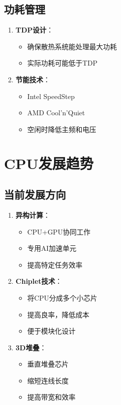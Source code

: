 \documentclass[12pt,UTF8]{ctexbook}
\begin{document}
\section{功耗管理}

\begin{enumerate}
    \item \textbf{TDP设计}：
    \begin{itemize}[leftmargin=2em]
        \item 确保散热系统能处理最大功耗
        \item 实际功耗可能低于TDP
    \end{itemize}
    
    \item \textbf{节能技术}：
    \begin{itemize}[leftmargin=2em]
        \item Intel SpeedStep
        \item AMD Cool'n'Quiet
        \item 空闲时降低主频和电压
    \end{itemize}
\end{enumerate}

\chapter{CPU发展趋势}

\section{当前发展方向}

\begin{enumerate}
    \item \textbf{异构计算}：
    \begin{itemize}[leftmargin=2em]
        \item CPU+GPU协同工作
        \item 专用AI加速单元
        \item 提高特定任务效率
    \end{itemize}
    
    \item \textbf{Chiplet技术}：
    \begin{itemize}[leftmargin=2em]
        \item 将CPU分成多个小芯片
        \item 提高良率，降低成本
        \item 便于模块化设计
    \end{itemize}
    
    \item \textbf{3D堆叠}：
    \begin{itemize}[leftmargin=2em]
        \item 垂直堆叠芯片
        \item 缩短连线长度
        \item 提高带宽和效率
    \end{itemize}
\end{enumerate}
\end{document}
